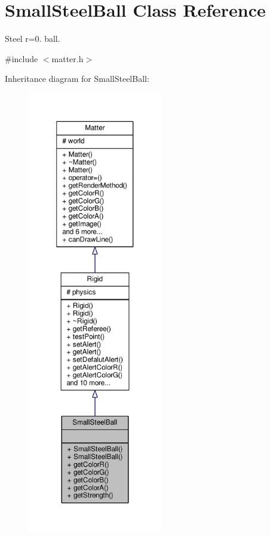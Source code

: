 \hypertarget{classSmallSteelBall}{}\section{Small\+Steel\+Ball Class Reference}
\label{classSmallSteelBall}


Steel r=0. ball.  




{\ttfamily \#include $<$matter.\+h$>$}



Inheritance diagram for Small\+Steel\+Ball\+:\nopagebreak
\begin{figure}[H]
\begin{center}
\leavevmode
\includegraphics[height=550pt]{classSmallSteelBall__inherit__graph}
\end{center}
\end{figure}


